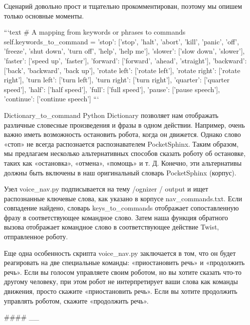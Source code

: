 Сценарий довольно прост и тщательно прокомментирован, поэтому мы опишем только основные моменты.

```text
# A mapping from keywords or phrases to commands
self.keywords_to_command = {'stop': ['stop', 'halt', 'abort', 'kill',
'panic', 'off', 'freeze', 'shut down', 'turn off', 'help', 'help me'],
'slower': ['slow down', 'slower'],
'faster': ['speed up', 'faster'],
'forward': ['forward', 'ahead',
'straight'],
'backward': ['back', 'backward', 'back up'],
'rotate left': ['rotate left'],
'rotate right': ['rotate right'],
'turn left': ['turn left'],
'turn right': ['turn right'],
'quarter': ['quarter speed'],
'half': ['half speed'],
'full': ['full speed'],
'pause': ['pause speech'],
'continue': ['continue speech']}
```

Dictionary\_to\_command Python Dictionary позволяет нам отображать различные словесные произведения и фразы в одном действии. Например, очень важно иметь возможность остановить робота, когда он движется. Однако слово «стоп» не всегда распознается распознавателем PocketSphinx. Таким образом, мы предлагаем несколько альтернативных способов сказать роботу об остановке, таких как «остановка», «отмена», «помощь» и т. Д. Конечно, эти альтернативы должны быть включены в наш оригинальный словарь PocketSphinx (корпус).

Узел voice\_nav.py подписывается на тему /ognizer / output и ищет распознанные ключевые слова, как указано в корпусе nav\_commands.txt. Если совпадение найдено, словарь keys\_to\_commands отображает сопоставленную фразу в соответствующее командное слово. Затем наша функция обратного вызова отображает командное слово в соответствующее действие Twist, отправленное роботу.

Еще одна особенность скрипта voice\_nav.py заключается в том, что он будет реагировать на две специальные команды: «приостановить речь» и «продолжить речь». Если вы голосом управляете своим роботом, но вы хотите сказать что-то другому человеку, при этом робот не интерпретирует ваши слова как команды движения, просто скажите «приостановить речь». Если вы хотите продолжить управлять роботом, скажите «продолжить речь».

#### \_\_

